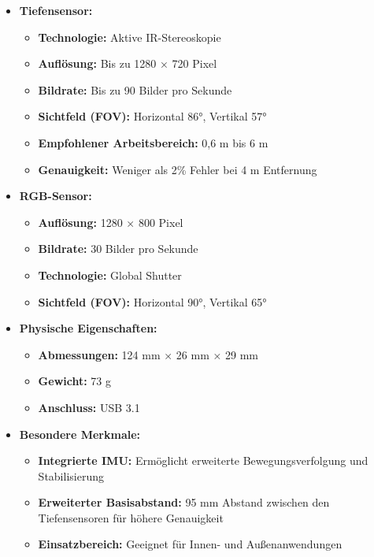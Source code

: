 \documentclass[a4paper,12pt]{article}
\begin{document}
\begin{itemize}
    \item \textbf{Tiefensensor:}
    \begin{itemize}
        \item \textbf{Technologie:} Aktive IR-Stereoskopie
        \item \textbf{Auflösung:} Bis zu 1280 × 720 Pixel
        \item \textbf{Bildrate:} Bis zu 90 Bilder pro Sekunde
        \item \textbf{Sichtfeld (FOV):} Horizontal 86°, Vertikal 57°
        \item \textbf{Empfohlener Arbeitsbereich:} 0,6 m bis 6 m
        \item \textbf{Genauigkeit:} Weniger als 2\% Fehler bei 4 m Entfernung
    \end{itemize}
    \item \textbf{RGB-Sensor:}
    \begin{itemize}
        \item \textbf{Auflösung:} 1280 × 800 Pixel
        \item \textbf{Bildrate:} 30 Bilder pro Sekunde
        \item \textbf{Technologie:} Global Shutter
        \item \textbf{Sichtfeld (FOV):} Horizontal 90°, Vertikal 65°
    \end{itemize}
    \item \textbf{Physische Eigenschaften:}
    \begin{itemize}
        \item \textbf{Abmessungen:} 124 mm × 26 mm × 29 mm
        \item \textbf{Gewicht:} 73 g
        \item \textbf{Anschluss:} USB 3.1
    \end{itemize}
    \item \textbf{Besondere Merkmale:}
    \begin{itemize}
        \item \textbf{Integrierte IMU:} Ermöglicht erweiterte Bewegungsverfolgung und Stabilisierung
        \item \textbf{Erweiterter Basisabstand:} 95 mm Abstand zwischen den Tiefensensoren für höhere Genauigkeit
        \item \textbf{Einsatzbereich:} Geeignet für Innen- und Außenanwendungen
    \end{itemize}
\end{itemize}
\end{document}
